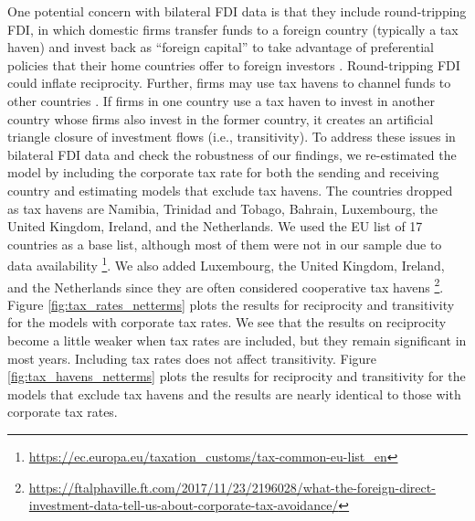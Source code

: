 \documentclass[reqno,onecolumn,letterpaper,12pt]{article}
\begin{document}
{One potential concern with bilateral FDI data is that they include round-tripping FDI, in which domestic firms transfer funds to a foreign country (typically a tax haven) and invest back as ``foreign capital'' to take advantage of preferential policies that their home countries offer to foreign investors \citep{Borga:2016}. Round-tripping FDI could inflate reciprocity. Further, firms may use tax havens to channel funds to other countries \citep{Borga:2017}. If firms in one country use a tax haven to invest in another country whose firms also invest in the former country, it creates an artificial triangle closure of investment flows (i.e., transitivity). To address these issues in bilateral FDI data and check the robustness of our findings, we re-estimated the model by including the corporate tax rate for both the sending and receiving country \citep{WB} and estimating models that exclude tax havens. The countries dropped as tax havens are Namibia, Trinidad and Tobago, Bahrain, Luxembourg, the United Kingdom, Ireland, and the Netherlands. We used the EU list of 17 countries as a base list, although most of them were not in our sample due to data availability \footnote{\url{https://ec.europa.eu/taxation_customs/tax-common-eu-list_en}}.  We also added Luxembourg, the United Kingdom, Ireland, and the Netherlands since they are often considered cooperative tax havens \footnote{\url{https://ftalphaville.ft.com/2017/11/23/2196028/what-the-foreign-direct-investment-data-tell-us-about-corporate-tax-avoidance/}}. Figure \ref{fig:tax_rates_netterms} plots the results for reciprocity and transitivity for the models with corporate tax rates. We see that the results on reciprocity become a little weaker when tax rates are included, but they remain significant in most years. Including tax rates does not affect transitivity.
Figure \ref{fig:tax_havens_netterms} plots the results for reciprocity and transitivity for the models that exclude tax havens and the results are nearly identical to those with corporate tax rates.

}
\end{document}
